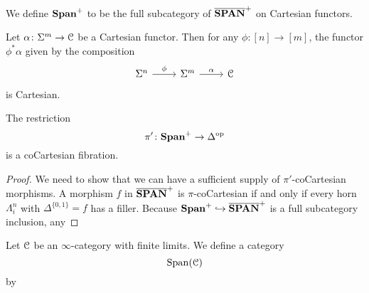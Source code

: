 \documentclass[main.tex]{subfiles}
\begin{document}
\begin{definition}
  We define $\mathbf{Span}^{+}$ to be the full subcategory of $\overline{\mathbf{SPAN}}^{+}$ on Cartesian functors.
\end{definition}

\begin{lemma}
  Let $\alpha\colon \Sigma^{m} \to \mathcal{C}$ be a Cartesian functor. Then for any $\phi\colon [n] \to [m]$, the functor $\phi^{*}\alpha$ given by the composition
  \begin{equation*}
    \begin{tikzcd}
      \Sig^{n}
      \arrow[r, "\phi"]
      & \Sig^{m}
      \arrow[r, "\alpha"]
      & \category{C}
    \end{tikzcd}
  \end{equation*}
  is Cartesian.
\end{lemma}

\begin{corollary}
  The restriction
  \begin{equation*}
    \pi'\colon \mathbf{Span}^{+} \to \Delta^{\mathrm{op}}
  \end{equation*}
  is a coCartesian fibration.
\end{corollary}
\begin{proof}
  We need to show that we can have a sufficient supply of $\pi'$-coCartesian morphisms. A morphism $f$ in $\overline{\mathbf{SPAN}}^{+}$ is $\pi$-coCartesian if and only if every horn $\Lambda^{n}_{i}$ with $\Delta^{\{0, 1\}} = f$ has a filler. Because $\mathbf{Span}^{+} \hookrightarrow \overline{\mathbf{SPAN}}^{+}$ is a full subcategory inclusion, any
\end{proof}

\begin{definition}
  \label{def:category_of_spans}
  Let $\mathcal{C}$ be an $\infty$-category with finite limits. We define a category
  \begin{equation*}
    \mathrm{Span}(\mathcal{C})
  \end{equation*}
  by
\end{definition}

%
\end{document}
